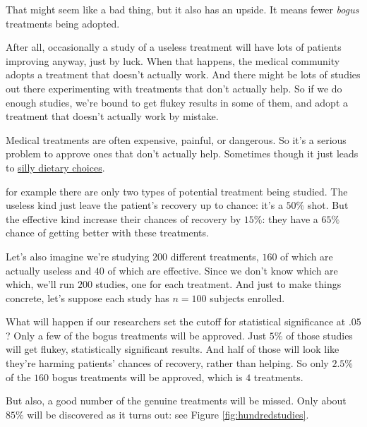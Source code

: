 \documentclass[justified]{tufte-book}
\theoremstyle{definition}
\theoremstyle{definition}
\theoremstyle{definition}
\theoremstyle{definition}
\theoremstyle{remark}
\begin{document}
That might seem like a bad thing, but it also has an upside. It means fewer \emph{bogus} treatments being adopted.

After all, occasionally a study of a useless treatment will have lots of patients improving anyway, just by luck. When that happens, the medical community adopts a treatment that doesn't actually work.
And there might be lots of studies out there experimenting with treatments that don't actually help. So if we do enough studies, we're bound to get flukey results in some of them, and adopt a treatment that doesn't actually work by mistake.

\begin{marginfigure}
Medical treatments are often expensive, painful, or dangerous. So it's a
serious problem to approve ones that don't actually help. Sometimes
though it just leads to \href{https://xkcd.com/882/}{silly dietary
choices}.
\end{marginfigure}

 for example there are only two types of potential treatment being studied. The useless kind just leave the patient's recovery up to chance: it's a \(50\%\) shot. But the effective kind increase their chances of recovery by \(15\%\): they have a \(65\%\) chance of getting better with these treatments.

Let's also imagine we're studying \(200\) different treatments, \(160\) of which are actually useless and \(40\) of which are effective. Since we don't know which are which, we'll run \(200\) studies, one for each treatment. And just to make things concrete, let's suppose each study has \(n = 100\) subjects enrolled.

What will happen if our researchers set the cutoff for statistical significance at \(.05\)? Only a few of the bogus treatments will be approved. Just \(5\%\) of those studies will get flukey, statistically significant results. And half of those will look like they're harming patients' chances of recovery, rather than helping. So only \(2.5\%\) of the \(160\) bogus treatments will be approved, which is \(4\) treatments.

But also, a good number of the genuine treatments will be missed. Only about \(85\%\) will be discovered as it turns out: see Figure \ref{fig:hundredstudies}.
\end{document}
